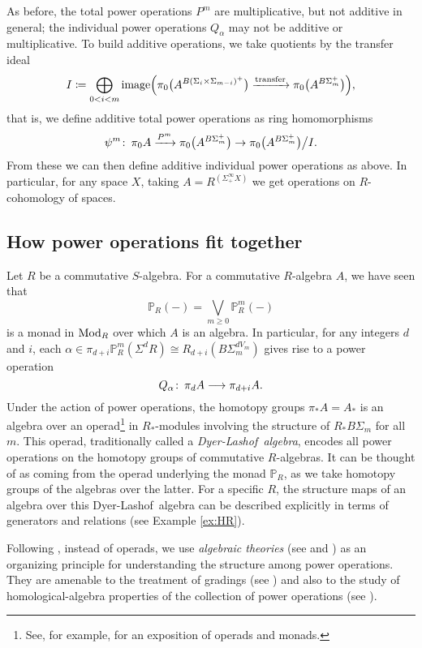 \documentclass{gtpart}
\theoremstyle{definition}
\theoremstyle{remark}
\def\co{\colon\thinspace}
\newcommand{\mb}[1]{\mathbb{#1}}
\newcommand{\Mod}{{\rm Mod}}
\newcommand{\DL}{Dyer-Lashof~}
\newcommand{\BP}{{\mb P}}
\newcommand{\A}{\alpha}
\newcommand{\ce}{\coloneqq}
\numberwithin{equation}{section}
\numberwithin{thm}{section}
\begin{document}
As before, the total power operations $P^m$ are multiplicative, but not 
additive in general; the individual power operations $Q_\A$ may not be 
additive or multiplicative.  To build additive operations, we take 
quotients by the transfer ideal 
\begin{equation}
\label{I}
 I \ce \bigoplus_{0<i<m} {\rm image} 
 \Big( \pi_0 \big( A^{B(\Sigma_i \times \Sigma_{m-i})^+} \big) 
 \xrightarrow{\rm transfer} \pi_0 \big( A^{B\Sigma_m^+} \big) \Big), 
\end{equation}
that is, we define additive total power operations as ring homomorphisms 
\begin{equation}
\label{total}
 \psi^m \co \pi_0 A \xrightarrow{P^m} \pi_0 \big( A^{B\Sigma_m^+} \big) 
 \to \pi_0 \big( A^{B\Sigma_m^+} \big) \big/ I.  
\end{equation}
From these we can then define additive individual power operations as 
above.  In particular, for any space $X$, taking 
$A = R^{(\Sigma_+^\infty X)}$ we get operations on $R$-cohomology of 
spaces.  


\subsection{How power operations fit together}
\label{subsec:fit}

Let $R$ be a commutative $S$-algebra.  For a commutative $R$-algebra $A$, 
we have seen that 
\[
 \BP_R (-) = \bigvee_{m \geq 0} \BP_R^m (-) 
\]
is a monad in $\Mod_R$ over which $A$ is an algebra.  In particular, for 
any integers $d$ and $i$, each 
$\A \in \pi_{d+i} \BP_R^m (\Sigma^d R) \cong R_{d+i} (B\Sigma_m^{dV_m})$ 
gives rise to a power operation 
\[
 Q_\A \co \pi_d A \longrightarrow \pi_{d+i} A.  
\]
Under the action of power operations, the homotopy groups 
$\pi_* A = A_*$ is an algebra over an operad\footnote{See, for example, 
\cite[Sections 1.1.2-3]{wahl} for an exposition of operads and monads.  } 
in $R_*$-modules involving the structure of $R_* B\Sigma_m$ for all $m$.  
This operad, traditionally called a {\em \DL algebra}, encodes all power 
operations on the homotopy groups of commutative $R$-algebras.  It can 
be thought of as coming from the operad underlying the monad $\BP_R$, as 
we take homotopy groups of the algebras over the latter.  For a specific 
$R$, the structure maps of an algebra over this \DL algebra can be 
described explicitly in terms of generators and relations (see Example 
\ref{ex:HR}).  

Following \cite{lpo}, instead of operads, we use {\em algebraic 
theories} (see \cite{lawvere} and \cite[Chapter 3]{borceux}) as an 
organizing principle for understanding the structure among power 
operations.  They are amenable to the treatment of gradings (see 
\cite{cong}) and also to the study of homological-algebra properties of 
the collection of power operations (see \cite{koszul}).  
\end{document}
